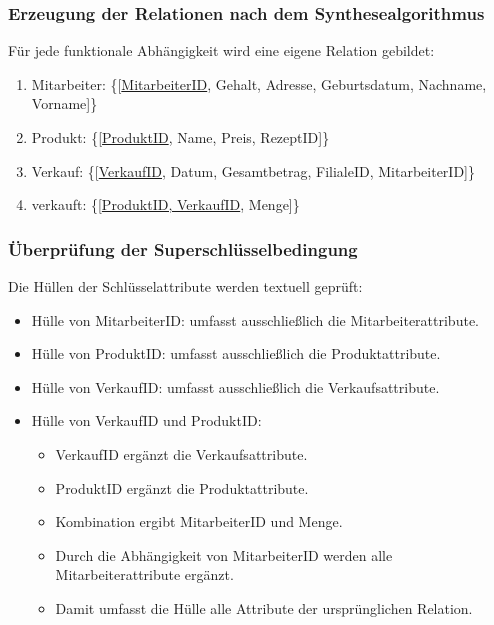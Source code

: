 \documentclass[a4paper]{article}
\begin{document}
\subsubsection*{Erzeugung der Relationen nach dem Synthesealgorithmus}

Für jede funktionale Abhängigkeit wird eine eigene Relation gebildet:

\begin{enumerate}
    \item Mitarbeiter: \{[\underline{MitarbeiterID}, Gehalt, Adresse, Geburtsdatum, Nachname, Vorname]\}
    \item Produkt: \{[\underline{ProduktID}, Name, Preis, RezeptID]\}
    \item Verkauf: \{[\underline{VerkaufID}, Datum, Gesamtbetrag, FilialeID, MitarbeiterID]\}
    \item verkauft: \{[\underline{ProduktID, VerkaufID}, Menge]\}
\end{enumerate}

\newpage
\subsubsection*{Überprüfung der Superschlüsselbedingung}

Die Hüllen der Schlüsselattribute werden textuell geprüft:

\begin{itemize}
    \item Hülle von MitarbeiterID: umfasst ausschließlich die Mitarbeiterattribute.
    \item Hülle von ProduktID: umfasst ausschließlich die Produktattribute.
    \item Hülle von VerkaufID: umfasst ausschließlich die Verkaufsattribute.
    \item Hülle von VerkaufID und ProduktID: 
    \begin{itemize}
        \item VerkaufID ergänzt die Verkaufsattribute.
        \item ProduktID ergänzt die Produktattribute.
        \item Kombination ergibt MitarbeiterID und Menge.
        \item Durch die Abhängigkeit von MitarbeiterID werden alle Mitarbeiterattribute ergänzt.
        \item Damit umfasst die Hülle alle Attribute der ursprünglichen Relation.
    \end{itemize}
\end{itemize}
\end{document}
